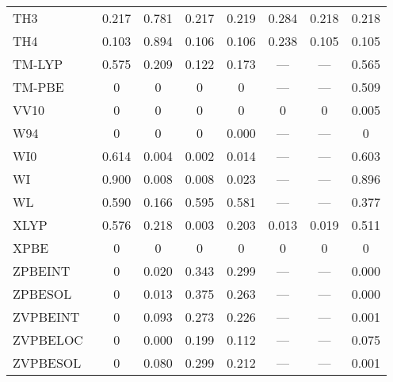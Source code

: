 \begin{table}
\begin{tabular}{|l|c|c|c|c|c|c|c|}
TH3~\cite{Handy1998_707} & 0.217 & 0.781 & 0.217 & 0.219 & 0.284 & 0.218 & 0.218 \\
TH4~\cite{Handy1998_707} & 0.103 & 0.894 & 0.106 & 0.106 & 0.238 & 0.105 & 0.105 \\
TM-LYP~\cite{Thakkar2009_134109} & 0.575 & 0.209 & 0.122 & 0.173 & --- & --- & 0.565 \\
TM-PBE~\cite{Thakkar2009_134109} & 0 & 0 & 0 & 0 & --- & --- & 0.509 \\
VV10~\cite{Vydrov2010_244103} & 0 & 0 & 0 & 0 & 0 & 0 & 0.005 \\
W94~\cite{Wilson1994_337} & 0 & 0 & 0 & 0.000 & --- & --- & 0 \\
WI0~\cite{Wilson1998_523} & 0.614 & 0.004 & 0.002 & 0.014 & --- & --- & 0.603 \\
WI~\cite{Wilson1998_523} & 0.900 & 0.008 & 0.008 & 0.023 & --- & --- & 0.896 \\
WL~\cite{Wilson1990_12930} & 0.590 & 0.166 & 0.595 & 0.581 & --- & --- & 0.377 \\
XLYP~\cite{Xu2004_2673} & 0.576 & 0.218 & 0.003 & 0.203 & 0.013 & 0.019 & 0.511 \\
XPBE~\cite{Xu2004_4068} & 0 & 0 & 0 & 0 & 0 & 0 & 0 \\
ZPBEINT~\cite{Constantin2011_233103} & 0 & 0.020 & 0.343 & 0.299 & --- & --- & 0.000 \\
ZPBESOL~\cite{Constantin2011_233103} & 0 & 0.013 & 0.375 & 0.263 & --- & --- & 0.000 \\
ZVPBEINT~\cite{Constantin2012_194105} & 0 & 0.093 & 0.273 & 0.226 & --- & --- & 0.001 \\
ZVPBELOC~\cite{Fabiano2015_122} & 0 & 0.000 & 0.199 & 0.112 & --- & --- & 0.075 \\
ZVPBESOL~\cite{Constantin2012_194105} & 0 & 0.080 & 0.299 & 0.212 & --- & --- & 0.001 \\
\bottomrule
\end{tabular}
\end{table}
